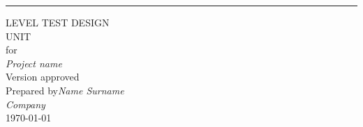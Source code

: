\begin{flushright}
    \rule{16cm}{5pt}\vskip1cm
    \begin{bfseries}
        \Huge{LEVEL TEST DESIGN \\UNIT}\\
        \vspace{1.9cm}
        for\\
        \vspace{1.9cm}
	    \textit{Project name}\\
        \vspace{1.9cm}
        \LARGE{Version \myversion approved}\\
        \vspace{1.9cm}
        Prepared by\textit{Name Surname}\\
        \vspace{1.9cm}
        \textit{Company}\\
        \vspace{1.9cm}
        \today\\
    \end{bfseries}
\end{flushright}